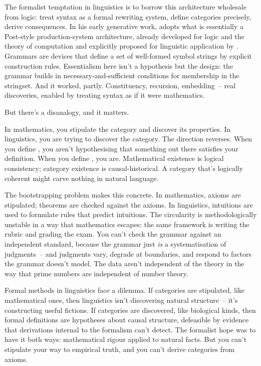 The formalist temptation in linguistics is to borrow this architecture wholesale from logic: treat syntax as a formal rewriting system, define categories precisely, derive consequences. In his early generative work, \textcite{chomsky1957} adopts what is essentially a Post-style production-system architecture, already developed for logic and the theory of computation \parencite{post1943formal,post1944recursively,pullum2025prehistory} and explicitly proposed for linguistic application by \textcite{rosenbloom1950elements}. Grammars are devices that define a set of well-formed symbol strings by explicit construction rules. Essentialism here isn't a hypothesis but the design: the grammar builds in necessary-and-sufficient conditions for membership in the stringset. And it worked, partly. Constituency, recursion, embedding~-- real discoveries, enabled by treating syntax as if it were mathematics.

But there's a disanalogy, and it matters.

In mathematics, you stipulate the category and discover its properties. In linguistics, you are trying to discover the category. The direction reverses. When you define , you aren't hypothesising that something out there satisfies your definition. When you define , you are. Mathematical existence is logical consistency; category existence is causal-historical. A category that's logically coherent might carve nothing in natural language.

The bootstrapping problem makes this concrete. In mathematics, axioms are stipulated; theorems are checked against the axioms. In linguistics, intuitions are used to formulate rules that predict intuitions. The circularity is methodologically unstable in a way that mathematics escapes: the same framework is writing the rubric and grading the exam. You can't check the grammar against an independent standard, because the grammar just \emph{is} a systematisation of judgments~-- and judgments vary, degrade at boundaries, and respond to factors the grammar doesn't model. The data aren't independent of the theory in the way that prime numbers are independent of number theory.

Formal methods in linguistics face a dilemma. If categories are stipulated, like mathematical ones, then linguistics isn't discovering natural structure~-- it's constructing useful fictions. If categories are discovered, like biological kinds, then formal definitions are hypotheses about causal structure, defeasible by evidence that derivations internal to the formalism can't detect. The formalist hope was to have it both ways: mathematical rigour applied to natural facts. But you can't stipulate your way to empirical truth, and you can't derive categories from axioms.


